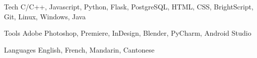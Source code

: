 
\begin{cvhonors}

  \cvhonor
    {Tech} %
    {C/C++, Javascript, Python, Flask, PostgreSQL, HTML, CSS, BrightScript, Git, Linux, Windows, Java} %
    {} %

  \cvhonor
    {Tools} %
    {Adobe Photoshop, Premiere, InDesign, Blender, PyCharm, Android Studio} %
    {} %

  \cvhonor
    {Languages} %
    {English, French, Mandarin, Cantonese}
    {} %

\end{cvhonors}
